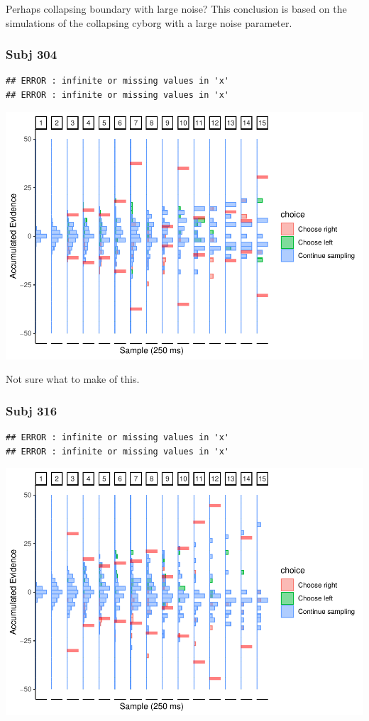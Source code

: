 \documentclass[
]{book}
\begin{document}
Perhaps collapsing boundary with large noise? This conclusion is based on the simulations of the collapsing cyborg with a large noise parameter.

\hypertarget{subj-304}{%
\subsubsection*{Subj 304}\label{subj-304}}

\begin{verbatim}
## ERROR : infinite or missing values in 'x' 
## ERROR : infinite or missing values in 'x'
\end{verbatim}

\includegraphics{LateNightBayes_files/figure-latex/unnamed-chunk-30-1.pdf}

Not sure what to make of this.

\hypertarget{subj-316}{%
\subsubsection*{Subj 316}\label{subj-316}}

\begin{verbatim}
## ERROR : infinite or missing values in 'x' 
## ERROR : infinite or missing values in 'x'
\end{verbatim}

\includegraphics{LateNightBayes_files/figure-latex/unnamed-chunk-31-1.pdf}
\end{document}
